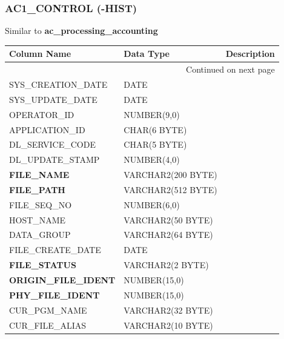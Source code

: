 \documentclass[12pt,twoside]{article}
\begin{document}
\normalsize
\subsubsection{AC1\_CONTROL (-HIST)}
\label{sec-8-3-2}

    Similar to \textbf{ac\_processing\_accounting}
\scriptsize
\begin{longtable}{lll}

\hline
 \textbf{Column Name}          &  \textbf{Data Type}  &  Description \\
\hline
\endhead
\hline\multicolumn{3}{r}{Continued on next page}\
\endfoot
\endlastfoot
 \textbf{IDENTIFIER}           &  NUMBER(15,0)        &               \\
 SYS\_CREATION\_DATE           &  DATE                &               \\
 SYS\_UPDATE\_DATE             &  DATE                &               \\
 OPERATOR\_ID                  &  NUMBER(9,0)         &               \\
 APPLICATION\_ID               &  CHAR(6 BYTE)        &               \\
 DL\_SERVICE\_CODE             &  CHAR(5 BYTE)        &               \\
 DL\_UPDATE\_STAMP             &  NUMBER(4,0)         &               \\
 \textbf{FILE\_NAME}           &  VARCHAR2(200 BYTE)  &               \\
 \textbf{FILE\_PATH}           &  VARCHAR2(512 BYTE)  &               \\
 FILE\_SEQ\_NO                 &  NUMBER(6,0)         &               \\
 HOST\_NAME                    &  VARCHAR2(50 BYTE)   &               \\
 DATA\_GROUP                   &  VARCHAR2(64 BYTE)   &               \\
 FILE\_CREATE\_DATE            &  DATE                &               \\
 \textbf{FILE\_STATUS}         &  VARCHAR2(2 BYTE)    &               \\
 \textbf{ORIGIN\_FILE\_IDENT}  &  NUMBER(15,0)        &               \\
 \textbf{PHY\_FILE\_IDENT}     &  NUMBER(15,0)        &               \\
 CUR\_PGM\_NAME                &  VARCHAR2(32 BYTE)   &               \\
 CUR\_FILE\_ALIAS              &  VARCHAR2(10 BYTE)   &               \\

\end{longtable}
\end{document}
